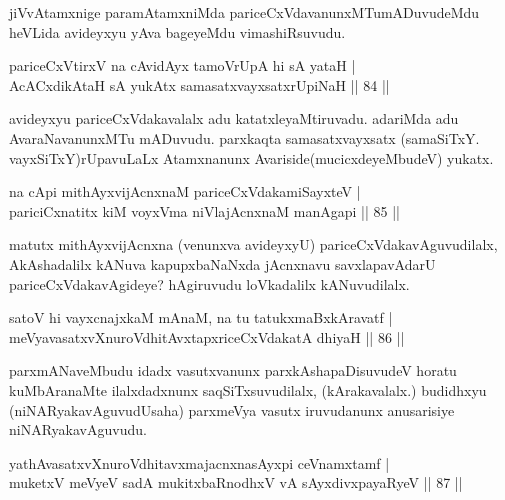 \begin{artha}
jiVvAtamxnige paramAtamxniMda pariceCxVdavanunxMTumADuvudeMdu heVLida avideyxyu yAva bageyeMdu vimashiRsuvudu.
\end{artha}


\begin{shl}
\footnotemark{}pariceCxVtirxV na cAvidAyx tamoVrUpA hi sA yataH |\\
AcACxdikA\s taH sA yukAtx samasatxvayxsatxrUpiNaH \hfill || 84 ||
\end{shl}

\begin{artha}
avideyxyu pariceCxVdakavalalx adu katatxleyaMtiruvadu. adariMda adu AvaraNavanunxMTu mADuvudu. parxkaqta samasatxvayxsatx (samaSiTxY. vayxSiTxY)rUpavuLaLx Atamxnanunx Avariside(mucicxdeyeMbudeV) yukatx.
\end{artha}

\begin{shl}
na cApi mithAyxvijAcnxnaM pariceCxVdakamiSayxteV |\\
pariciCxnatitx kiM voyxVma niVlajAcnxnaM manAgapi \hfill || 85 ||
\end{shl}

\begin{artha}
matutx mithAyxvijAcnxna (venunxva avideyxyU) pariceCxVdakavAguvudilalx, AkAshadalilx 
kANuva kapupxbaNaNxda jAcnxnavu savxlapavAdarU pariceCxVdakavAgideye? hAgiruvudu loVkadalilx 
kANuvudilalx.
\end{artha}

\begin{shl}
satoV hi vayxcnajxkaM mAnaM, na tu tatukxmaBxkAravatf |\\
meVyavasatxvXnuroVdhitAvxtapxriceCxVdakatA dhiyaH \hfill || 86 ||
\end{shl}

\begin{artha}
parxmANaveMbudu idadx vasutxvanunx parxkAshapaDisuvudeV horatu kuMbAranaMte ilalxdadxnunx 
saqSiTxsuvudilalx, (kArakavalalx.) budidhxyu (niNARyakavAguvudUsaha) parxmeVya vasutx 
iruvudanunx anusarisiye niNARyakavAguvudu.
\end{artha}

\begin{shl}
yathAvasatxvXnuroVdhitavxmajacnxnasAyxpi ceVnamxtamf |\\
muketxV meVyeV sadA mukitxbaRnodhxV vA sAyxdivxpayaRyeV \hfill || 87 ||
\end{shl}

